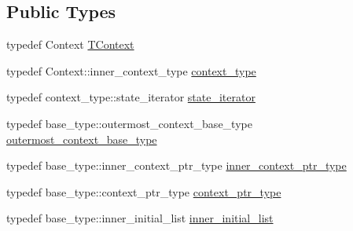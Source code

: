 \subsection*{Public Types}
\begin{DoxyCompactItemize}
\item 
typedef Context \hyperlink{classsmacc_1_1SmaccState_a9953ba0428a8c46f7d72c70bc3f87db4}{T\+Context}
\item 
typedef Context\+::inner\+\_\+context\+\_\+type \hyperlink{classsmacc_1_1SmaccState_a65c128d05dbcadbf817f41ba20b8fa01}{context\+\_\+type}
\item 
typedef context\+\_\+type\+::state\+\_\+iterator \hyperlink{classsmacc_1_1SmaccState_a12497b38e710f07cacb5d45efc024339}{state\+\_\+iterator}
\item 
typedef base\+\_\+type\+::outermost\+\_\+context\+\_\+base\+\_\+type \hyperlink{classsmacc_1_1SmaccState_aaf76bbe2aa9dd73e3284605f84ab4b16}{outermost\+\_\+context\+\_\+base\+\_\+type}
\item 
typedef base\+\_\+type\+::inner\+\_\+context\+\_\+ptr\+\_\+type \hyperlink{classsmacc_1_1SmaccState_a65a772c2e2039e9a59148ba6ffb54d8a}{inner\+\_\+context\+\_\+ptr\+\_\+type}
\item 
typedef base\+\_\+type\+::context\+\_\+ptr\+\_\+type \hyperlink{classsmacc_1_1SmaccState_a0e15b77514301039f6bc093a9d3f6425}{context\+\_\+ptr\+\_\+type}
\item 
typedef base\+\_\+type\+::inner\+\_\+initial\+\_\+list \hyperlink{classsmacc_1_1SmaccState_acb4ac84bce421d39b594510a6b2df558}{inner\+\_\+initial\+\_\+list}
\end{DoxyCompactItemize}
